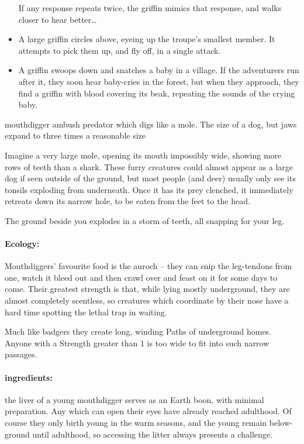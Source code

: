 \begin{multicols}{2}
\begin{itemize}
    If any response repeats twice, the griffin mimics that response, and walks closer to hear better\ldots
  \fi
  \item
  A large griffin circles above, eyeing up the troupe's smallest member.
  It attempts to pick them up, and fly off, in a single attack.
  \item
  A griffin swoops down and snatches a baby in a village.
  If the adventurers run after it, they soon hear baby-cries in the forest, but when they approach, they find a griffin with blood covering its beak, repeating the sounds of the crying baby.

\end{itemize}

  {mouthdigger}%
  {ambush predator which digs like a mole.  The size of a dog, but jaws expand to three times a reasonable size}%

Imagine a very large mole, opening its mouth impossibly wide, showing more rows of teeth than a shark.
These furry creatures could almost appear as a large dog if seen outside of the ground, but most people (and deer) usually only see its tonsils exploding from underneath.
Once it has its prey clenched, it immediately retreats down its narrow hole, to be eaten from the feet to the head.

\begin{boxtext}

  The ground beside you explodes in a storm of teeth, all snapping for your leg.

\end{boxtext}

\paragraph{Ecology:} Mouthdiggers' favourite food is the auroch -- they can snip the leg-tendons from one, watch it bleed out and then crawl over and feast on it for some days to come.
Their greatest strength is that, while lying mostly underground, they are almost completely scentless, so creatures which coordinate by their nose have a hard time spotting the lethal trap in waiting.

Much like badgers they create long, winding Paths of underground homes.  Anyone with a Strength greater than 1 is too wide to fit into such narrow passages.

\paragraph{\Glspl{ingredient}:}
the liver of a young mouthdigger serves as an Earth \gls{boon}, with minimal preparation.
Any which can open their eyes have already reached adulthood.
Of course they only birth young in the warm seasons, and the young remain below-ground until adulthood, so accessing the litter always presents a challenge.


\end{multicols}
